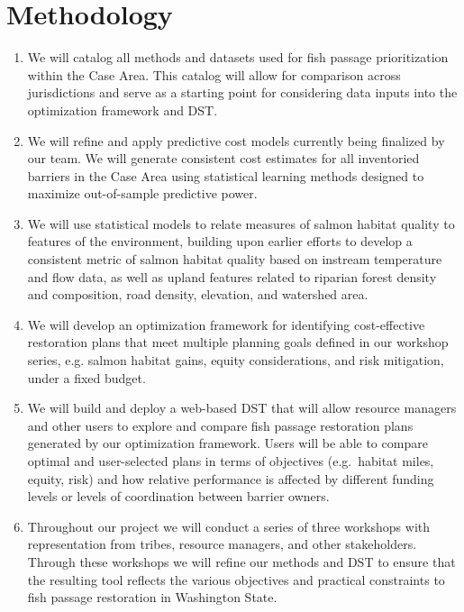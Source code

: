 \documentclass[12pt]{elsarticle}
\begin{document}
		\section{Methodology} 
			\begin{enumerate}
				\item We will catalog all methods and datasets used for fish passage prioritization within the Case Area. This catalog will allow for comparison across jurisdictions and serve as a starting point for considering data inputs into the optimization framework and DST.
				\item We will refine and apply predictive cost models currently being finalized by our team. We will generate consistent cost estimates for all inventoried barriers in the Case Area using statistical learning methods designed to maximize out-of-sample predictive power.
				\item We will use statistical models to relate measures of salmon habitat quality to features of the environment, building upon earlier efforts to develop a consistent metric of salmon habitat quality based on instream temperature and flow data, as well as upland features related to riparian forest density and composition, road density, elevation, and watershed area.
				\item We will develop an optimization framework for identifying cost-effective restoration plans that meet multiple planning
				goals defined in our workshop series, e.g. salmon habitat gains, equity considerations, and risk mitigation, under a fixed budget.
				\item We will build and deploy a web-based DST that will allow resource managers and other users to explore and compare fish passage restoration plans generated by our optimization framework. Users will be able to compare optimal and user-selected plans in terms of objectives (e.g.\ habitat miles, equity, risk) and how relative performance is affected by different funding levels or levels of coordination between barrier owners.
				\item Throughout our project we will conduct a series of three workshops with representation from tribes, resource managers, and other stakeholders. Through these workshops we will refine our methods and DST to ensure that the resulting tool reflects the various objectives and practical constraints to fish passage restoration in Washington State.
			\end{enumerate}
\end{document}
